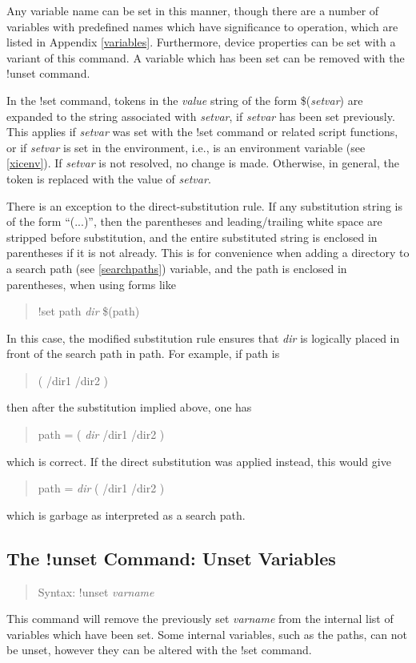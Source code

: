 Any variable name can be set in this manner, though there are a number
of variables with predefined names which have significance to {\Xic}
operation, which are listed in Appendix \ref{variables}.  Furthermore,
device properties can be set with a variant of this command.  A
variable which has been set can be removed with the {\cb !unset}
command.

In the {\cb !set} command, tokens in the {\it value} string of the
form \$({\it setvar}) are expanded to the string associated with {\it
setvar}, if {\it setvar} has been set previously.  This applies if
{\it setvar} was set with the {\cb !set} command or related script
functions, or if {\it setvar} is set in the environment, i.e., is an
environment variable (see \ref{xicenv}).  If {\it setvar} is not
resolved, no change is made.  Otherwise, in general, the token is
replaced with the value of {\it setvar}.

There is an exception to the direct-substitution rule.  If any
substitution string is of the form ``{\vt (...)}'', then the
parentheses and leading/trailing white space are stripped before
substitution, and the entire substituted string is enclosed in
parentheses if it is not already.  This is for convenience when adding
a directory to a search path (see \ref{searchpaths}) variable, and the
path is enclosed in parentheses, when using forms like
\begin{quote}
\vt !set path {\it dir} \$(path)
\end{quote}
In this case, the modified substitution rule ensures that {\it dir} is
logically placed in front of the search path in {\vt path}.  For
example, if {\vt path} is
\begin{quote}
\vt ( /dir1 /dir2 )
\end{quote}
then after the substitution implied above, one has
\begin{quote}
\vt path = ( {\it dir} /dir1 /dir2 )
\end{quote}
which is correct.  If the direct substitution was applied instead,
this would give
\begin{quote}
\vt path = {\it dir} ( /dir1 /dir2 )
\end{quote}
which is garbage as interpreted as a search path.

\subsection{The {\cb !unset} Command: Unset Variables}
\begin{quote}
Syntax: {\vt !unset} {\it varname}
\end{quote}
This command will remove the previously set {\it varname} from the
internal list of variables which have been set.  Some internal variables,
such as the paths, can not be unset, however they can be altered with the
{\cb !set} command.

